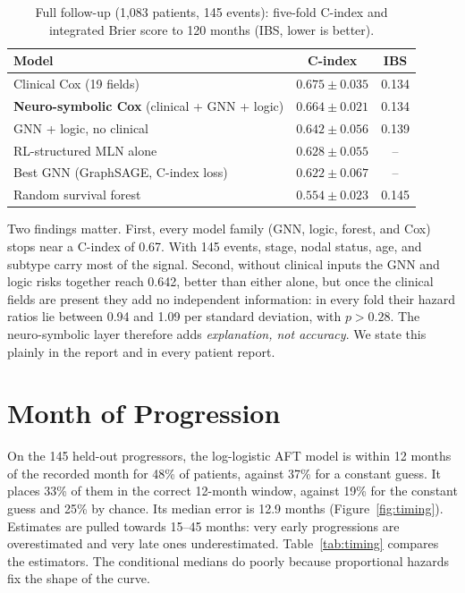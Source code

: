 \documentclass{mnnit}
\begin{document}
\begin{table}[!htbp]
  \centering
  \small\setlength{\tabcolsep}{4pt}
  \caption{Full follow-up (1,083 patients, 145 events): five-fold C-index and integrated Brier score to 120 months
  (IBS, lower is better).}
  \label{tab:ns}
  \begin{tabular}{lcc}
    \toprule
    Model & C-index & IBS \\
    \midrule
    Clinical Cox (19 fields) & $0.675 \pm 0.035$ & 0.134 \\
    \textbf{Neuro-symbolic Cox} (clinical + GNN + logic) & $\mathbf{0.664 \pm 0.021}$ & 0.134 \\
    GNN + logic, no clinical & $0.642 \pm 0.056$ & 0.139 \\
    RL-structured MLN alone & $0.628 \pm 0.055$ & -- \\
    Best GNN (GraphSAGE, C-index loss) & $0.622 \pm 0.067$ & -- \\
    Random survival forest & $0.554 \pm 0.023$ & 0.145 \\
    \bottomrule
  \end{tabular}
\end{table}

Two findings matter. First, every model family (GNN, logic, forest, and Cox) stops near a C-index of 0.67. With 145
events, stage, nodal status, age, and subtype carry most of the signal. Second, without clinical inputs the GNN and
logic risks together reach 0.642, better than either alone, but once the clinical fields are present they add no
independent information: in every fold their hazard ratios lie between 0.94 and 1.09 per standard deviation, with
$p>0.28$. The neuro-symbolic layer therefore adds \emph{explanation, not accuracy}. We state this
plainly in the report and in every patient report.

\section{Month of Progression}
On the 145 held-out progressors, the log-logistic AFT model is within 12 months of the recorded month for 48\% of
patients, against 37\% for a constant guess. It places 33\% of them in the correct 12-month window, against 19\% for the
constant guess and 25\% by chance. Its median error is 12.9 months (Figure~\ref{fig:timing}). Estimates are pulled
towards 15--45 months: very early progressions are overestimated and very late ones underestimated.
Table~\ref{tab:timing} compares the estimators. The conditional medians do poorly because proportional hazards fix the
shape of the curve.
\end{document}
